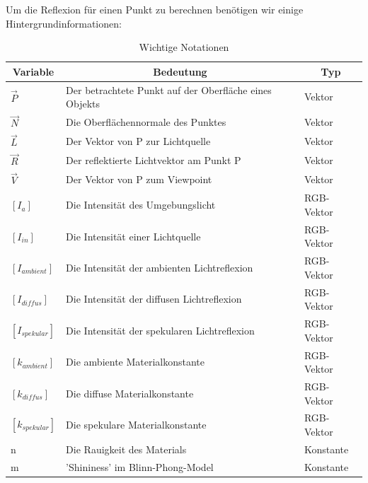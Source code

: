 \documentclass[a4paper]{scrartcl}%
\begin{document}
    Um die Reflexion für einen Punkt zu berechnen benötigen wir einige Hintergrundinformationen:\\
    \begin{table}[H]
    \caption{Wichtige Notationen}
    \label{table:vars}
    \begin{tabular}{l|l|l}
        \hline
        \multicolumn{1}{|c|}{Variable} & \multicolumn{1}{c|}{Bedeutung}                         & \multicolumn{1}{c|}{Typ} \\ \hline
        $\vec{P}$                              & Der betrachtete Punkt auf der Oberfläche eines Objekts & Vektor                   \\ \hline
        $\vec{N}$                              & Die Oberflächennormale des Punktes                     & Vektor                   \\ \hline
        $\vec{L}$                              & Der Vektor von P zur Lichtquelle                       & Vektor                   \\ \hline
        $\vec{R}$                              & Der reflektierte Lichtvektor am Punkt P                & Vektor                   \\ \hline
        $\vec{V}$                              & Der Vektor von P zum Viewpoint                         & Vektor                   \\ \hline
        $[I_{a}]$                    & Die Intensität des Umgebungslicht                      & RGB-Vektor               \\ \hline
        $[I_{in}]$                         & Die Intensität einer Lichtquelle                       & RGB-Vektor               \\ \hline
        $[I_{ambient}]$                         & Die Intensität der ambienten Lichtreflexion                       & RGB-Vektor               \\ \hline
        $[I_{diffus}]$                         & Die Intensität der diffusen Lichtreflexion                       & RGB-Vektor               \\ \hline
        $[I_{spekular}]$                         & Die Intensität der spekularen Lichtreflexion                       & RGB-Vektor               \\ \hline
        $[k_{ambient}]$                    & Die ambiente Materialkonstante                         & RGB-Vektor               \\ \hline
        $[k_{diffus}]$                     & Die diffuse Materialkonstante                          & RGB-Vektor               \\ \hline
        $[k_{spekular}]$                   & Die spekulare Materialkonstante                        & RGB-Vektor              \\ \hline
        n                   & Die Rauigkeit des Materials                        & Konstante              \\ \hline
        m                   & 'Shininess' im Blinn-Phong-Model                        & Konstante
    \end{tabular}
    \end{table}
\end{document}

